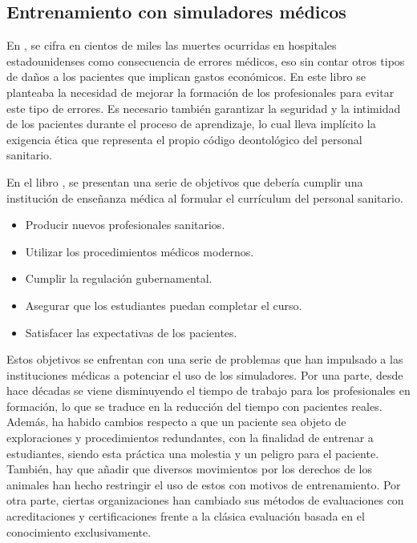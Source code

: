 
\subsection{Entrenamiento con simuladores médicos}
\label{art:entrenamiento}



En \cite{donaldson2000err}, se cifra en cientos de miles las muertes ocurridas en hospitales estadounidenses como consecuencia de errores médicos, eso sin contar otros tipos de daños a los pacientes que implican gastos económicos. En este libro se planteaba la necesidad de mejorar la formación de los profesionales para evitar este tipo de errores. 
Es necesario también garantizar la seguridad y la intimidad de los pacientes durante el proceso de aprendizaje, lo cual lleva implícito la exigencia ética que representa el propio código deontológico del personal sanitario. 

En el libro \cite{dent2017practical}, se presentan una serie de objetivos que debería cumplir una institución de enseñanza médica al formular el currículum del personal sanitario.
\begin{itemize}
    \item Producir nuevos profesionales sanitarios.
    \item Utilizar los procedimientos médicos modernos.
    \item Cumplir la regulación gubernamental.
    \item Asegurar que los estudiantes puedan completar el curso.
    \item Satisfacer las expectativas de los pacientes.
\end{itemize}

Estos objetivos se enfrentan con una serie de problemas que han impulsado a las instituciones médicas a potenciar el uso de los simuladores.
Por una parte, desde hace décadas se viene disminuyendo el tiempo de trabajo para los profesionales en formación, lo que se traduce en la reducción del tiempo con pacientes reales. Además, ha habido cambios respecto a que un paciente sea objeto de exploraciones y procedimientos redundantes, con la finalidad de entrenar a estudiantes, siendo esta práctica una molestia y un peligro para el paciente. También, hay que añadir que diversos movimientos por los derechos de los animales han hecho restringir el uso de estos con motivos de entrenamiento. Por otra parte, ciertas organizaciones han cambiado sus métodos de evaluaciones con acreditaciones y certificaciones frente a la clásica evaluación basada en el conocimiento exclusivamente.

